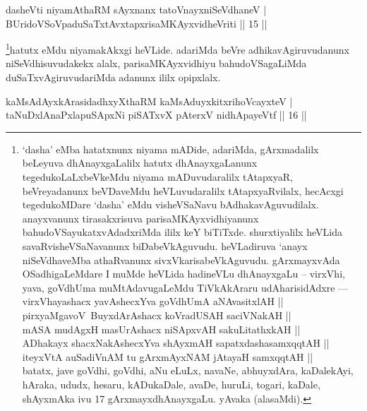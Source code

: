 
\begin{shl}
dasheVti niyamAthaRM sAyxnanx tatoV\s nayxniSeVdhaneV | \\
BUridoVSoVpaduSaTxtAvxtapxrisaMKAyxvidheVriti \hfill|| 15 || 
\end{shl}

\begin{artha}
\footnote{`dasha' eMba hatatxnunx niyama mADide, adariMda, gArxmadalilx beLeyuva dhAnayxgaLalilx hatutx dhAnayxgaLanunx tegedukoLaLxbeVkeMdu niyama mADuvudaralilx tAtapxyaR, beVreyadanunx beVDaveMdu heVLuvudaralilx tAtapxyaRvilalx, hecAcxgi tegedukoMDare `dasha' eMdu visheVSaNavu bAdhakavAguvudilalx. anayxvanunx tirasakxrisuva parisaMKAyxvidhiyanunx bahudoVSayukatxvAdadxriMda ililx keY biTiTxde. shurxtiyalilx heVLida savaRvisheVSaNavanunx biDabeVkAguvudu. heVLadiruva `anayx niSeVdhaveMba athaRvanunx sivxVkarisabeVkAguvudu. gArxmayxvAda OSadhigaLeMdare I muMde heVLida hadineVLu dhAnayxgaLu -- virxVhi, yava, goVdhUma muMtAdavugaLeMdu TiVkAkAraru udAharisidAdxre --- \\ virxVhayashacx yavAshecxYva goVdhUmA aNAvasitxlAH ||\\
pirxyaMgavoV\ BuyxdArAshacx koVradUSAH saciVNakAH ||\\
mASA mudAgxH masUrAshacx niSApxvAH sakuLitathxkAH ||\\
ADhakayx shacxNakAshecxYva shAyxmAH sapatxdashasamxqqtAH ||\\
iteyxVtA auSadiVnAM tu gArxmAyxNAM jAtayaH samxqqtAH ||\\ batatx, jave goVdhi, goVdhi, aNu eLuLx, navaNe, abhuyxdAra, kaDalekAyi, hAraka, ududx, hesaru, kADukaDale, avaDe, huruLi, togari, kaDale, shAyxmAka ivu 17 gArxmayxdhAnayxgaLu. yAvaka (alasaMdi).}hatutx eMdu niyamakAkxgi heVLide. adariMda beVre adhikavAgiruvudanunx niSeVdhisuvudakekx alalx, parisaMKAyxvidhiyu bahudoVSagaLiMda duSaTxvAgiruvuda\-riMda adanunx ililx opipxlalx.
\end{artha}



\begin{shl}
kaMsAdAyxkArasidadhxyXthaRM kaMsAduyxkitxrihoVcayxteV | \\
taNuDxlAnaPxlapuSApxNi piSATxvX pAterxV nidhApayeVtf \hfill|| 16 || 
\end{shl}

